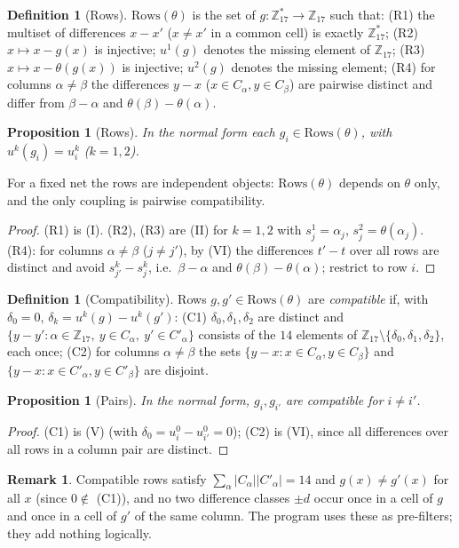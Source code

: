 \documentclass[11pt,a4paper]{article}
\newtheorem{proposition}[theorem]{Proposition}
\theoremstyle{definition}
\newtheorem{definition}[theorem]{Definition}
\newtheorem{remark}[theorem]{Remark}
\newcommand{\Zp}{\mathbb{Z}_{17}}
\newcommand{\Zs}{\mathbb{Z}_{17}^{*}}
\newcommand{\Rows}{\mathrm{Rows}}
\begin{document}
\begin{definition}[Rows]\label{def:rows}
$\Rows(\theta)$ is the set of $g:\Zs\to\Zp$ such that:
(R1) the multiset of differences $x-x'$ ($x\ne x'$ in a common cell) is exactly $\Zs$;
(R2) $x\mapsto x-g(x)$ is injective; $u^1(g)$ denotes the missing element of $\Zp$;
(R3) $x\mapsto x-\theta(g(x))$ is injective; $u^2(g)$ denotes the missing element;
(R4) for columns $\alpha\ne\beta$ the differences $y-x$ ($x\in C_\alpha,y\in C_\beta$) are pairwise distinct and differ from $\beta-\alpha$ and $\theta(\beta)-\theta(\alpha)$.
\end{definition}

\begin{proposition}[Rows]\label{prop:rows}
In the normal form each $g_i\in\Rows(\theta)$, with $u^k(g_i)=u^k_i$ ($k=1,2$).
\end{proposition}
For a fixed net the rows are independent objects: $\Rows(\theta)$ depends on $\theta$ only, and the only coupling is pairwise compatibility.
\begin{proof}
(R1) is (I). (R2), (R3) are (II) for $k=1,2$ with $s^1_j=\alpha_j$, $s^2_j=\theta(\alpha_j)$. (R4): for columns $\alpha\ne\beta$ ($j\ne j'$), by (VI) the differences $t'-t$ over all rows are distinct and avoid $s^k_{j'}-s^k_j$, i.e.\ $\beta-\alpha$ and $\theta(\beta)-\theta(\alpha)$; restrict to row $i$.
\end{proof}

\begin{definition}[Compatibility]\label{def:compat}
Rows $g,g'\in\Rows(\theta)$ are \emph{compatible} if, with $\delta_0=0$, $\delta_k=u^k(g)-u^k(g')$:
(C1) $\delta_0,\delta_1,\delta_2$ are distinct and $\{y-y':\alpha\in\Zp,\ y\in C_\alpha,\ y'\in C'_\alpha\}$ consists of the $14$ elements of $\Zp\setminus\{\delta_0,\delta_1,\delta_2\}$, each once;
(C2) for columns $\alpha\ne\beta$ the sets $\{y-x:x\in C_\alpha,y\in C_\beta\}$ and $\{y-x:x\in C'_\alpha,y\in C'_\beta\}$ are disjoint.
\end{definition}

\begin{proposition}[Pairs]\label{prop:pairs}
In the normal form, $g_i,g_{i'}$ are compatible for $i\ne i'$.
\end{proposition}
\begin{proof}
(C1) is (V) (with $\delta_0=u^0_i-u^0_{i'}=0$); (C2) is (VI), since all differences over all rows in a column pair are distinct.
\end{proof}

\begin{remark}\label{rem:redundant}
Compatible rows satisfy $\sum_\alpha|C_\alpha||C'_\alpha|=14$ and $g(x)\ne g'(x)$ for all $x$ (since $0\notin$ (C1)), and no two difference classes $\pm d$ occur once in a cell of $g$ and once in a cell of $g'$ of the same column. The program uses these as pre-filters; they add nothing logically.
\end{remark}
\end{document}
